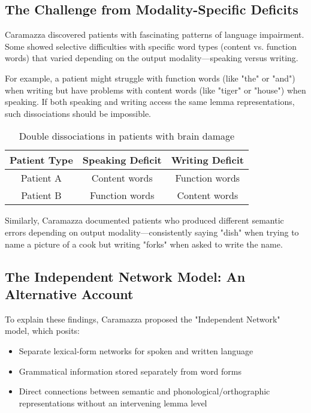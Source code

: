 \documentclass[12pt,a4paper]{article}
\begin{document}
\subsection{The Challenge from Modality-Specific Deficits}

Caramazza discovered patients with fascinating patterns of language impairment. Some showed selective difficulties with specific word types (content vs. function words) that varied depending on the output modality—speaking versus writing.

For example, a patient might struggle with function words (like "the" or "and") when writing but have problems with content words (like "tiger" or "house") when speaking. If both speaking and writing access the same lemma representations, such dissociations should be impossible.

\begin{table}[h]
\centering
\begin{tabular}{|c|c|c|}
\hline
\textbf{Patient Type} & \textbf{Speaking Deficit} & \textbf{Writing Deficit} \\
\hline
Patient A & Content words & Function words \\
\hline
Patient B & Function words & Content words \\
\hline
\end{tabular}
\caption{Double dissociations in patients with brain damage}
\label{tbl:patient_dissociations}
\end{table}

Similarly, Caramazza documented patients who produced different semantic errors depending on output modality—consistently saying "dish" when trying to name a picture of a cook but writing "forks" when asked to write the name.

\subsection{The Independent Network Model: An Alternative Account}

To explain these findings, Caramazza proposed the "Independent Network" model, which posits:

\begin{itemize}
\item Separate lexical-form networks for spoken and written language
\item Grammatical information stored separately from word forms
\item Direct connections between semantic and phonological/orthographic representations without an intervening lemma level
\end{itemize}
\end{document}
